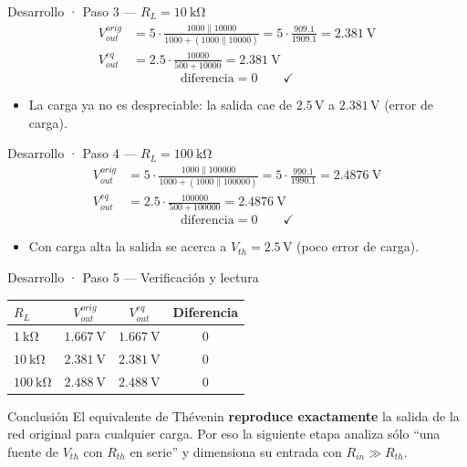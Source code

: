 \documentclass[aspectratio=169]{beamer}
\begin{document}
\begin{frame}{Desarrollo · Paso 3 — $R_L = \SI{10}{\kilo\ohm}$}
  \begin{align*}
    V_{out}^{orig} &= 5\cdot\frac{1000\parallel 10000}{1000 + (1000\parallel 10000)}
                     = 5\cdot\frac{909.1}{1909.1} = \SI{2.381}{\volt}\\[2pt]
    V_{out}^{eq} &= 2.5\cdot\frac{10000}{500+10000} = \SI{2.381}{\volt}
  \end{align*}
  \[
    \text{diferencia} = 0 \qquad\checkmark
  \]
  \pause
  \begin{itemize}
    \item La carga ya no es despreciable: la salida cae de $2.5\,\text{V}$ a $2.381\,\text{V}$ (error de carga).
  \end{itemize}
\end{frame}

\begin{frame}{Desarrollo · Paso 4 — $R_L = \SI{100}{\kilo\ohm}$}
  \begin{align*}
    V_{out}^{orig} &= 5\cdot\frac{1000\parallel 100000}{1000 + (1000\parallel 100000)}
                     = 5\cdot\frac{990.1}{1990.1} = \SI{2.4876}{\volt}\\[2pt]
    V_{out}^{eq} &= 2.5\cdot\frac{100000}{500+100000} = \SI{2.4876}{\volt}
  \end{align*}
  \[
    \text{diferencia} = 0 \qquad\checkmark
  \]
  \pause
  \begin{itemize}
    \item Con carga alta la salida se acerca a $V_{th} = 2.5\,\text{V}$ (poco error de carga).
  \end{itemize}
\end{frame}

\begin{frame}{Desarrollo · Paso 5 — Verificación y lectura}
  \begin{table}
    \small
    \begin{tabular}{lccc}
      \toprule
      $R_L$ & $V_{out}^{orig}$ & $V_{out}^{eq}$ & Diferencia \\
      \midrule
      $\SI{1}{\kilo\ohm}$  & $\SI{1.667}{\volt}$ & $\SI{1.667}{\volt}$ & $0$ \\
      $\SI{10}{\kilo\ohm}$ & $\SI{2.381}{\volt}$ & $\SI{2.381}{\volt}$ & $0$ \\
      $\SI{100}{\kilo\ohm}$& $\SI{2.488}{\volt}$ & $\SI{2.488}{\volt}$ & $0$ \\
      \bottomrule
    \end{tabular}
  \end{table}
  \pause
  \begin{block}{Conclusión}
    El equivalente de Thévenin \textbf{reproduce exactamente} la salida de la red original
    para cualquier carga. Por eso la siguiente etapa analiza sólo ``una fuente de $V_{th}$
    con $R_{th}$ en serie'' y dimensiona su entrada con $R_{in} \gg R_{th}$.
  \end{block}
\end{frame}
\end{document}
